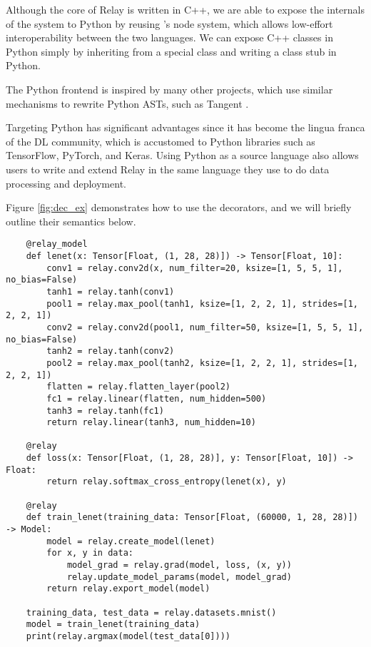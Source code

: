 Although the core of Relay is written in C++, we are able to expose the
internals of the system to Python by reusing \tvm's node system, which allows
low-effort interoperability between the two languages. We can expose C++
classes in Python simply by inheriting from a special class and
writing a class stub in Python.

The Python frontend is inspired by many other projects, which use similar
mechanisms to
rewrite Python ASTs, such as Tangent \cite{tangent} \cite{myia}.

Targeting Python has significant advantages since it has become the lingua franca of the DL
community, which is accustomed to Python libraries such as TensorFlow, PyTorch, and Keras. Using Python as a source language also allows users to write and extend Relay in the same language they use to do data processing and deployment.

Figure \ref{fig:dec_ex} demonstrates how to use the decorators, and we will
briefly outline their semantics below.

\begin{figure*}
\begin{verbatim}
    @relay_model
    def lenet(x: Tensor[Float, (1, 28, 28)]) -> Tensor[Float, 10]:
        conv1 = relay.conv2d(x, num_filter=20, ksize=[1, 5, 5, 1], no_bias=False)
        tanh1 = relay.tanh(conv1)
        pool1 = relay.max_pool(tanh1, ksize=[1, 2, 2, 1], strides=[1, 2, 2, 1])
        conv2 = relay.conv2d(pool1, num_filter=50, ksize=[1, 5, 5, 1], no_bias=False)
        tanh2 = relay.tanh(conv2)
        pool2 = relay.max_pool(tanh2, ksize=[1, 2, 2, 1], strides=[1, 2, 2, 1])
        flatten = relay.flatten_layer(pool2)
        fc1 = relay.linear(flatten, num_hidden=500)
        tanh3 = relay.tanh(fc1)
        return relay.linear(tanh3, num_hidden=10)

    @relay
    def loss(x: Tensor[Float, (1, 28, 28)], y: Tensor[Float, 10]) -> Float:
        return relay.softmax_cross_entropy(lenet(x), y)

    @relay
    def train_lenet(training_data: Tensor[Float, (60000, 1, 28, 28)]) -> Model:
        model = relay.create_model(lenet)
        for x, y in data:
            model_grad = relay.grad(model, loss, (x, y))
            relay.update_model_params(model, model_grad)
        return relay.export_model(model)

    training_data, test_data = relay.datasets.mnist()
    model = train_lenet(training_data)
    print(relay.argmax(model(test_data[0])))
\end{verbatim}
\caption{An example of the Relay Python decorator, which transforms a decorated
  function into an analogous one in Relay. The defined model is based on
  LeNet \cite{lenet} and is trained and tested on the MNIST dataset.}
\label{fig:dec_ex}
\end{figure*}

